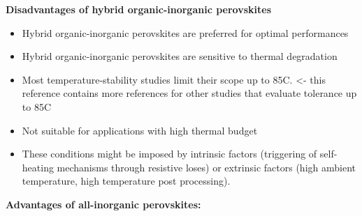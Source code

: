 \textbf{Disadvantages of hybrid organic-inorganic perovskites}

\begin{itemize}
    \item Hybrid organic-inorganic perovskites are preferred for optimal performances \cite{Zhang2021All-inorganicCells}
    \item Hybrid organic-inorganic perovskites are sensitive to thermal degradation
    \item Most temperature-stability studies limit their scope up to 85C. \cite{Yang2023InvertedPassivation} <- this reference contains more references for other studies that evaluate tolerance up to 85C
    \item Not suitable for applications with high thermal budget 
    \item These conditions might be imposed by intrinsic factors (triggering of self-heating mechanisms through resistive loses) or extrinsic factors (high ambient temperature, high temperature post processing)\cite{Handa2019LargePerovskite, Dong2021SupportingFilm, Li2022StructureTemperatures}.
\end{itemize}





\textbf{Advantages of all-inorganic perovskites: }

